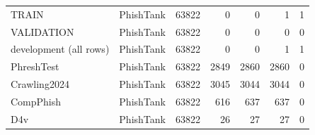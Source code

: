 \begin{table}[t]
\begin{tabular}{llrrrrr}
TRAIN & PhishTank & 63822 & 0 & 0 & 1 & 1 \\
VALIDATION & PhishTank & 63822 & 0 & 0 & 0 & 0 \\
development (all rows) & PhishTank & 63822 & 0 & 0 & 1 & 1 \\
PhreshTest & PhishTank & 63822 & 2849 & 2860 & 2860 & 0 \\
Crawling2024 & PhishTank & 63822 & 3045 & 3044 & 3044 & 0 \\
CompPhish & PhishTank & 63822 & 616 & 637 & 637 & 0 \\
D4v & PhishTank & 63822 & 26 & 27 & 27 & 0 \\
\bottomrule
\end{tabular}
\end{table}